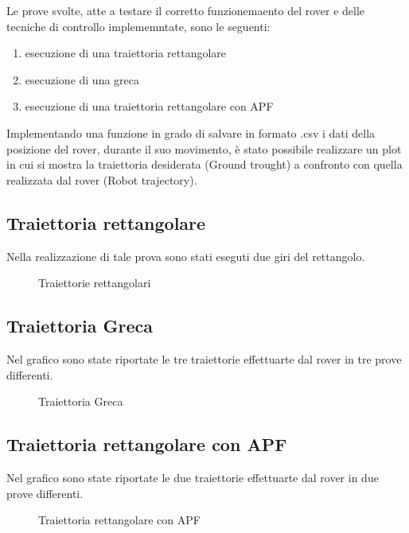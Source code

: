 \label{sec:res}
Le prove svolte, atte a testare il corretto funzionemaento del rover e delle tecniche di controllo implememntate, sono le seguenti:
\begin{enumerate}
  \item esecuzione di una traiettoria rettangolare 
  \item esecuzione di una greca 
  \item esecuzione di una traiettoria rettangolare con APF 
\end{enumerate}
 Implementando una funzione in grado di salvare in formato .csv i dati della posizione del rover, durante il suo movimento, è stato possibile realizzare un plot in cui si mostra la traiettoria desiderata (Ground trought) a confronto con quella realizzata dal rover (Robot trajectory).

\subsection{Traiettoria rettangolare}
Nella realizzazione di tale prova sono stati eseguti due giri del rettangolo.
\begin{figure} [H]
    \centering
    
    \caption{Traiettorie rettangolari}
    \label{fig:rect}
\end{figure} 

\subsection{Traiettoria Greca}
Nel grafico sono state riportate le tre traiettorie effettuarte dal rover in tre prove differenti. 
\begin{figure} [H]
    \centering
    
    \caption{Traiettoria Greca}
    \label{fig:greca}
\end{figure} 


\subsection{Traiettoria rettangolare con APF}
Nel grafico sono state riportate le due traiettorie effettuarte dal rover in due prove differenti. 
\begin{figure} [H]
    \centering
    
    \caption{Traiettoria rettangolare con APF}
    \label{fig:rectAPF}
\end{figure} 
